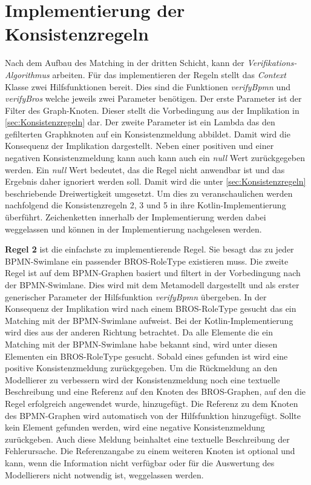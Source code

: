 \section{Implementierung der Konsistenzregeln}
\label{sec:implementaion_consistency_rules}

Nach dem Aufbau des Matching in der dritten Schicht, kann der \emph{Verifikations-Algorithmus} arbeiten.
Für das implementieren der Regeln stellt das \emph{Context} Klasse zwei Hilfsfunktionen bereit.
Dies sind die Funktionen \emph{verifyBpmn} und \emph{verifyBros} welche jeweils zwei Parameter benötigen.
Der erste Parameter ist der Filter des Graph-Knoten.
Dieser stellt die Vorbedingung aus der Implikation in \cref{sec:Konsistenzregeln} dar.
Der zweite Parameter ist ein Lambda das den gefilterten Graphknoten auf ein Konsistenzmeldung abbildet.
Damit wird die Konsequenz der Implikation dargestellt.
Neben einer positiven und einer negativen Konsistenzmeldung kann auch kann auch ein \emph{null} Wert zurückgegeben werden.
Ein \emph{null} Wert bedeutet, das die Regel nicht anwendbar ist und das Ergebnis daher ignoriert werden soll.
Damit wird die unter \cref{sec:Konsistenzregeln} beschriebende Dreiwertigkeit umgesetzt.
Um dies zu veranschaulichen werden nachfolgend die Konsistenzregeln 2, 3 und 5 in ihre Kotlin-Implementierung überführt.
Zeichenketten innerhalb der Implementierung werden dabei weggelassen und können in der Implementierung nachgelesen werden.

\textbf{Regel 2} ist die einfachste zu implementierende Regel.
Sie besagt das zu jeder BPMN-Swimlane ein passender BROS-RoleType existieren muss.
Die zweite Regel ist auf dem BPMN-Graphen basiert und filtert in der Vorbedingung nach der BPMN-Swimlane.
Dies wird mit dem Metamodell dargestellt und als erster generischer Parameter der Hilfsfunktion \emph{verifyBpmn} übergeben.
In der Konsequenz der Implikation wird nach einem BROS-RoleType gesucht das ein Matching mit der BPMN-Swimlane aufweist.
Bei der Kotlin-Implementierung wird dies aus der anderen Richtung betrachtet.
Da alle Elemente die ein Matching mit der BPMN-Swimlane habe bekannt sind, wird unter diesen Elementen ein BROS-RoleType gesucht.
Sobald eines gefunden ist wird eine positive Konsistenzmeldung zurückgegeben.
Um die Rückmeldung an den Modellierer zu verbessern wird der Konsistenzmeldung noch eine textuelle Beschreibung und eine Referenz auf den Knoten des BROS-Graphen, auf den die Regel erfolgreich angewendet wurde, hinzugefügt.
Die Referenz zu dem Knoten des BPMN-Graphen wird automatisch von der Hilfsfunktion hinzugefügt.
Sollte kein Element gefunden werden, wird eine negative Konsistenzmeldung zurückgeben.
Auch diese Meldung beinhaltet eine textuelle Beschreibung der Fehlerursache.
Die Referenzangabe zu einem weiteren Knoten ist optional und kann, wenn die Information nicht verfügbar oder für die Auswertung des Modellierers nicht notwendig ist, weggelassen werden.

